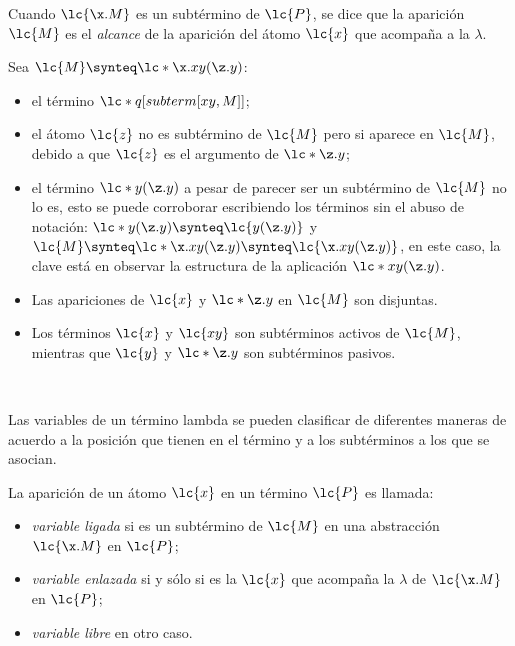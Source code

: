 Cuando \(\lc{\x.M}\) es un subtérmino de \(\lc{P}\), se dice que la aparición
\(\lc{M}\) es el \emph{alcance} de la aparición del átomo \(\lc{x}\) que
acompaña a la \(\lambda\). \\

\begin{ejemplo} Sea \(\lc{M}\synteq \lc*{\x.x y(\z.y)}\):
  \begin{itemize}
  \item el término \(\lc*{q[subterm[x y, M]]}\);
  \item el átomo \(\lc{z}\) no es subtérmino de \(\lc{M}\) pero si aparece en
    \(\lc{M}\), debido a que \(\lc{z}\) es el argumento de \(\lc*{\z.y}\);
  \item el término \(\lc*{y(\z.y)}\) a pesar de parecer ser un subtérmino de
    \(\lc{M}\) no lo es, esto se puede corroborar escribiendo los términos sin el
    abuso de notación: \(\lc*{y(\z.y)} \synteq \lc{y(\z.y)}\) y \(\lc{M} \synteq
    \lc*{\x.x y(\z.y)} \synteq \lc{\x.x y(\z.y)}\), en este caso, la clave está en
    observar la estructura de la aplicación \(\lc*{x y(\z.y)}\).
  \item Las apariciones de \(\lc{x}\) y \(\lc*{\z.y}\) en \(\lc{M}\) son
    disjuntas.
  \item Los términos \(\lc{x}\) y \(\lc{x y}\) son subtérminos activos de
    \(\lc{M}\), mientras que \(\lc{y}\) y \(\lc*{\z.y}\) son subtérminos pasivos.
  \end{itemize} 
\end{ejemplo} \

Las variables de un término lambda se pueden clasificar de diferentes maneras de
acuerdo a la posición que tienen en el término y a los subtérminos a los que se
asocian. \\

\begin{defi} La aparición de un átomo \(\lc{x}\) en
  un término \(\lc{P}\) es llamada: \
  \label{definicion:clasesvariables}
  \begin{itemize}
  \item \emph{variable ligada} si es un subtérmino de \(\lc{M}\) en una abstracción
    \(\lc{\x.M}\) en \(\lc{P}\);
  \item \emph{variable enlazada} si y sólo si es la \(\lc{x}\) que
    acompaña la \(\lambda\) de \(\lc{\x.M}\) en \(\lc{P}\);
  \item \emph{variable libre} en otro caso.
  \end{itemize}
\end{defi} \

